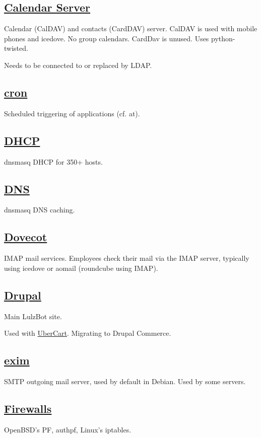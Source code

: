 \subsection{\href{http://www.calendarserver.org/}{Calendar Server}}
Calendar (CalDAV) and contacts (CardDAV) server. CalDAV is used with mobile
phones and icedove. No group calendars. CardDav is unused. Uses python-twisted.

Needs to be connected to or replaced by LDAP.

\subsection{\href{http://ftp.isc.org/isc/cron/}{cron}}
Scheduled triggering of applications (cf. at).

\subsection{\href{http://dnsmasq.org/}{DHCP}}
dnsmasq DHCP for 350+ hosts.

\subsection{\href{http://dnsmasq.org/}{DNS}}
dnsmasq DNS caching.

\subsection{\href{http://dnsmasq.org/}{Dovecot}}
IMAP mail services. Employees check their mail via the
IMAP server, typically using icedove or aomail (roundcube using IMAP).

\subsection{\href{http://www.drupal.org}{Drupal}}
Main LulzBot site.

Used with \href{http://www.ubercart.org/}{UberCart}.
Migrating to Drupal Commerce.

\subsection{\href{http://www.exim.org/}{exim}}
SMTP outgoing mail server, used by default in Debian. Used by some servers.

\subsection{\href{http://www.openbsd.org/faq/pf/}{Firewalls}}
OpenBSD's PF, authpf, Linux's iptables.

